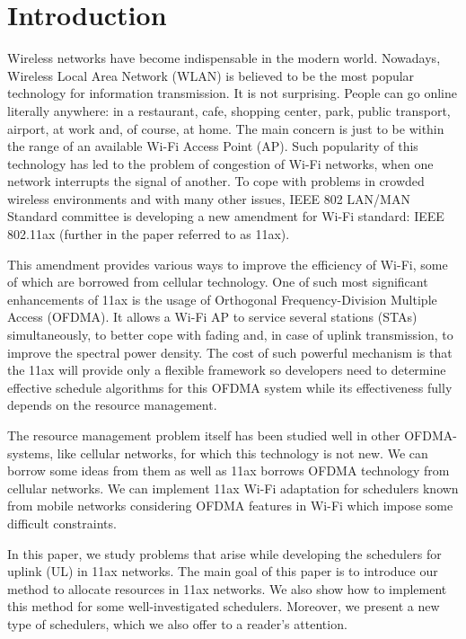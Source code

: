 \section{Introduction}

Wireless networks have become indispensable in the modern world.
Nowadays, Wireless Local Area Network (WLAN) is believed to be the most popular technology for information transmission. 
It is not surprising. 
People can go online literally anywhere: in a restaurant, cafe, shopping center, park, public transport, airport, at work and, of course, at home. 
The main concern is just to be within the range of an available Wi-Fi Access Point (AP). 
Such popularity of this technology has led to the problem of congestion of Wi-Fi networks, when one network interrupts the signal of another. 
To cope with problems in crowded wireless environments and with many other issues, IEEE 802 LAN/MAN Standard committee is developing a new amendment for Wi-Fi standard: IEEE 802.11ax (further in the paper referred to as 11ax). 

This amendment provides various ways to improve the efficiency of Wi-Fi, some of which are borrowed from cellular technology.
One of such most significant enhancements of 11ax is the usa\-ge of Orthogonal Frequency-Division Multiple Access (OFDMA). 
It allows a Wi-Fi AP to service several stations (STAs) simultaneously, to better cope with fading and, in case of uplink transmission, to improve the spectral power density. 
The cost of such powerful mechanism is that the 11ax will provide only a flexible framework so developers need to determine effective schedule algorithms for this OFDMA system while its effectiveness fully depends on the resource management. 

The resource management problem itself has been studied well in other OFDMA-systems, like cellular networks, for which this technology is not new. 
We can borrow some ideas from them as well as 11ax borrows OFDMA technology from cellular networks. 
We can implement 11ax Wi-Fi adaptation for schedulers known from mobile networks considering OFDMA features in Wi-Fi which impose some difficult constraints.  

In this paper, we study problems that arise while developing the schedulers for uplink (UL) in 11ax networks. The main goal of this paper is to introduce our method to allocate resources in 11ax networks. We also show how to implement this method for some well-investigated schedulers. 
Moreover, we present a new type of schedulers, which we also offer to a reader's attention.

